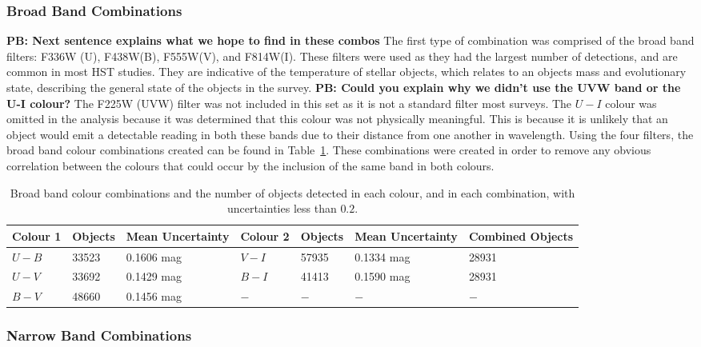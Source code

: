 \subsubsection{Broad Band Combinations}

\textbf{PB: Next sentence explains what we hope to find in these combos}
The first type of combination was comprised of the broad band filters: F336W (U), F438W(B), F555W(V), and F814W(I).
These filters were used as they had the largest number of detections, and are common in most HST studies. 
They are indicative of the temperature of stellar objects, which relates to an objects mass and evolutionary state, describing the general state of the objects in the survey.
\textbf{PB: Could you explain why we didn't use the UVW band or the U-I colour?}
The F225W (UVW) filter was not included in this set as it is not a standard filter most surveys.
The $U - I$ colour was omitted in the analysis because it was determined that this colour was not physically meaningful.
This is because it is unlikely that an object would emit a detectable reading in both these bands due to their distance from one another in wavelength.
Using the four filters, the broad band colour combinations created can be found in Table~\ref{tab:BBcombinations}.
These combinations were created in order to remove any obvious correlation between the colours that could occur by the inclusion of the same band in both colours.

\begin{table}
\centering
\caption{Broad band colour combinations and the number of objects detected in each colour, and in each combination, with uncertainties less than $0.2$.}
\label{tab:BBcombinations}
\begin{tabular}{lllllll}
\hline\hline
Colour 1 & Objects & Mean Uncertainty & Colour 2 & Objects & Mean Uncertainty & Combined Objects \\
\hline
$U - B$ &  33523 & 0.1606 mag & $V - I$ &  57935 & 0.1334 mag & 28931\\
$U - V$ &  33692 & 0.1429 mag & $B - I$ &  41413 & 0.1590 mag & 28931\\
$B - V$ &  48660 & 0.1456 mag & $ - $ & $ - $ & $ - $ & $ - $ \\
\hline
\end{tabular}
\end{table}

\subsubsection{Narrow Band Combinations}

